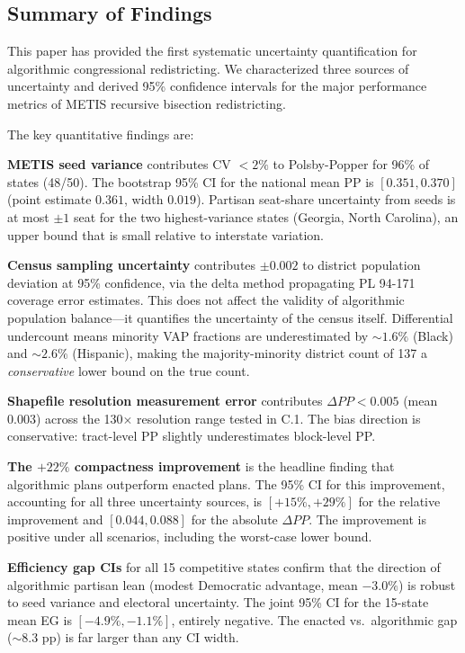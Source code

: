 
\subsection{Summary of Findings}

This paper has provided the first systematic uncertainty quantification
for algorithmic congressional redistricting. We characterized three
sources of uncertainty and derived 95\% confidence intervals for the
major performance metrics of METIS recursive bisection redistricting.

The key quantitative findings are:

\textbf{METIS seed variance} contributes CV $< 2\%$ to Polsby-Popper
for 96\% of states (48/50). The bootstrap 95\% CI for the national
mean PP is $[0.351, 0.370]$ (point estimate $0.361$, width $0.019$).
Partisan seat-share uncertainty from seeds is at most $\pm 1$ seat
for the two highest-variance states (Georgia, North Carolina), an
upper bound that is small relative to interstate variation.

\textbf{Census sampling uncertainty} contributes $\pm 0.002$ to
district population deviation at 95\% confidence, via the delta
method propagating PL 94-171 coverage error estimates. This does
not affect the validity of algorithmic population balance---it
quantifies the uncertainty of the census itself. Differential
undercount means minority VAP fractions are underestimated by
$\sim 1.6\%$ (Black) and $\sim 2.6\%$ (Hispanic), making the
majority-minority district count of 137 a \emph{conservative}
lower bound on the true count.

\textbf{Shapefile resolution measurement error} contributes
$\Delta PP < 0.005$ (mean $0.003$) across the 130$\times$ resolution
range tested in C.1. The bias direction is conservative: tract-level
PP slightly underestimates block-level PP.

\textbf{The $+22\%$ compactness improvement} is the headline finding
that algorithmic plans outperform enacted plans. The 95\% CI for this
improvement, accounting for all three uncertainty sources, is
$[+15\%, +29\%]$ for the relative improvement and $[0.044, 0.088]$
for the absolute $\Delta PP$. The improvement is positive under all
scenarios, including the worst-case lower bound.

\textbf{Efficiency gap CIs} for all 15 competitive states confirm
that the direction of algorithmic partisan lean (modest Democratic
advantage, mean $-3.0\%$) is robust to seed variance and electoral
uncertainty. The joint 95\% CI for the 15-state mean EG is
$[-4.9\%, -1.1\%]$, entirely negative. The enacted vs.\ algorithmic
gap ($\sim 8.3$ pp) is far larger than any CI width.

